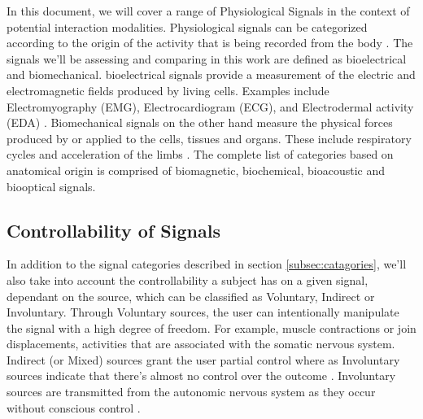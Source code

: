 In this document, we will cover a range of Physiological Signals in the context of potential interaction modalities. Physiological signals can be categorized according to the origin of the activity that is being recorded from the body \cite{enderle_introduction_2012}. The signals we'll be assessing and comparing in this work are defined as bioelectrical and biomechanical. bioelectrical signals provide a measurement of the electric and electromagnetic fields produced by living cells. Examples include Electromyography (EMG), Electrocardiogram (ECG), and Electrodermal activity (EDA) \cite{malmivuo_bioelectromagnetismprinciples_1995}. Biomechanical signals on the other hand measure the physical forces produced by or applied to the cells, tissues and organs. These include respiratory cycles and acceleration of the limbs \cite{guerreiro_bitalino_2013, pacelli_sensing_2006}. The complete list of categories based on anatomical origin is comprised of biomagnetic, biochemical, bioacoustic and biooptical signals.

\subsection{Controllability of Signals}

In addition to the signal categories described in section \ref{subsec:catagories}, we'll also take into account the controllability a subject has on a given signal, dependant on the source, which can be classified as Voluntary, Indirect or Involuntary. Through Voluntary sources, the user can intentionally manipulate the signal with a high degree of freedom. For example, muscle contractions or join displacements, activities that are associated with the somatic nervous system. Indirect (or Mixed) sources grant the user partial control where as Involuntary sources indicate that there's almost no control over the outcome \cite{da_silva_biosignal_2017}. Involuntary sources are transmitted from the autonomic nervous system as they occur without conscious control \cite{lenman_human_1975}.



